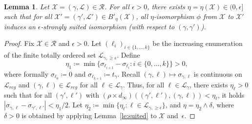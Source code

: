 \documentclass[11pt]{article}
\newtheorem{lemma}[theorem]{Lemma}
\def\Conf{{\mathscr{R}}}
\begin{document}
\begin{lemma}
  \label{le:strongsuited}
  Let $\mathcal{X}=(\gamma,\mathcal{L})\in\Conf$. For all $\epsilon>0$, there exists $\eta=\eta(\mathcal{X})\in(0,\epsilon]$ such that for all $\mathcal{X}'=(\gamma',\mathcal{L}')\in B'_{\eta}(\mathcal{X})$, all $\eta$-isomorphism $\phi$ from $\mathcal{X}$ to $\mathcal{X}'$ induces an $\epsilon$-strongly suited isomorphism (with respect to $(\gamma,\gamma')$).
\end{lemma}
\begin{proof}
  Fix $\mathcal{X}\in \Conf$ and $\epsilon>0$.
  Let $(\ell_i)_{i\in \{1,\dots , k\}}$ be the increasing enumeration of the finite totally ordered set $\mathcal{L}_{\gamma, \geq \epsilon}$. Define
  \[ \eta_1\coloneqq \min \{ \sigma_{\ell_{i+1}}-\sigma_{\ell_{i}} :i\in \{0,\dots, k\} \}>0,\]
  where formally $\sigma_{\ell_0}\coloneqq 0$ and $\sigma_{\ell_{k+1}}\coloneqq t_\gamma$. Recall $(\gamma,\ell)\mapsto \sigma_{\gamma,\ell}$ is continuous  on $\mathscr{L}_{reg}$ and $(\gamma,\ell)\in \mathscr{L}_{reg}$ for all  $\ell \in \mathcal{L}_\gamma$.
  Thus, for all $\ell\in \mathcal{L}_\gamma$, there exists $\eta_{\ell}>0$ such that for all $(\gamma',\ell')$ with $(\rho\times d_\infty)((\gamma',\ell' ),(\gamma,\ell) )<\eta_\ell$, it holds
  $|\sigma_{\gamma,\ell}-\sigma_{\gamma',\ell'}|< \eta_1/2$.
  Let $\eta_2\coloneqq \min \{ \eta_{\ell}: \ell \in \mathcal{L}_{\gamma, \geq \epsilon}\}$, and $\eta=\eta_2 \wedge \delta$, where $\delta>0$ is obtained by applying Lemma~\ref{le:suited} to $\mathcal{X}$ and~$\epsilon$.


\end{proof}
\end{document}
